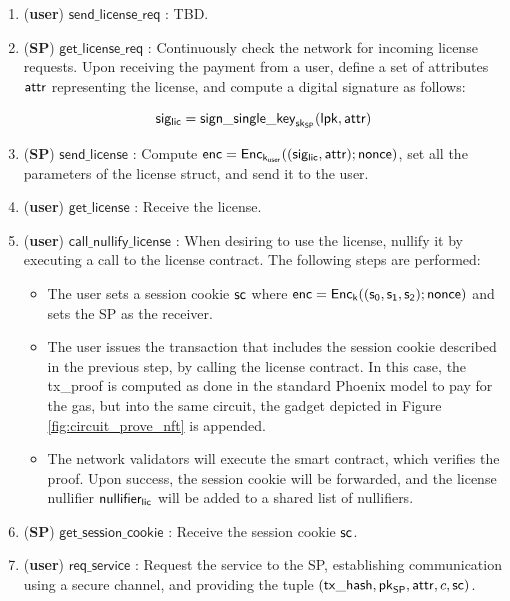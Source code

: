 \begin{enumerate}
	\item (\textbf{user}) $\mathsf{send\_license\_req}$ : TBD.

	\item (\textbf{SP}) $\mathsf{get\_license\_req}$ : Continuously check the network for incoming license requests. Upon receiving the payment from a user, define a set of attributes $\mathsf{attr}$ representing the license, and compute a digital signature as follows:

	$$\mathsf{sig_{lic}} = \mathsf{sign\_single\_key}_{\mathsf{sk}_{\mathsf{SP}}}(\mathsf{lpk}, \mathsf{attr})$$

	\item (\textbf{SP}) $\mathsf{send\_license}$ : Compute $\mathsf{enc} = \mathsf{Enc}_{\mathsf{k}_{\mathsf{user}}} ((\mathsf{sig_{lic}}, \mathsf{attr}); \mathsf{nonce})$, set all the parameters of the license struct, and send it to the user.

	\item (\textbf{user}) $\mathsf{get\_license}$ : Receive the license. 

	\item (\textbf{user}) $\mathsf{call\_nullify\_license}$ : When desiring to use the license, nullify it by executing a call to the license contract. The following steps are performed:

	\begin{itemize}
		\item The user sets a session cookie $\mathsf{sc}$ where $\mathsf{enc} = \mathsf{Enc}_{\mathsf{k}} ((\mathsf{s_0}, \mathsf{s_1}, \mathsf{s_2}); \mathsf{nonce})$ and sets the SP as the receiver.
		\item The user issues the transaction that includes the session cookie described in the previous step, by calling the license contract. In this case, the \textsf{tx\_proof} is computed as done in the standard Phoenix model to pay for the gas, but into the same circuit, the gadget depicted in Figure \ref{fig:circuit_prove_nft} is appended.
		\item The network validators will execute the smart contract, which verifies the proof. Upon success, the session cookie will be forwarded, and the license nullifier $\mathsf{nullifier_{lic}}$ will be added to a shared list of nullifiers.
	\end{itemize}

	\item (\textbf{SP}) $\mathsf{get\_session\_cookie}$ : Receive the session cookie $\mathsf{sc}$.

	\item (\textbf{user}) $\mathsf{req\_service}$ : Request the service to the SP, establishing communication using a secure channel, and providing the tuple $(\mathsf{tx\_hash}, \mathsf{pk}_{\mathsf{SP}}, \mathsf{attr}, c, \mathsf{sc})$.


\end{enumerate}
